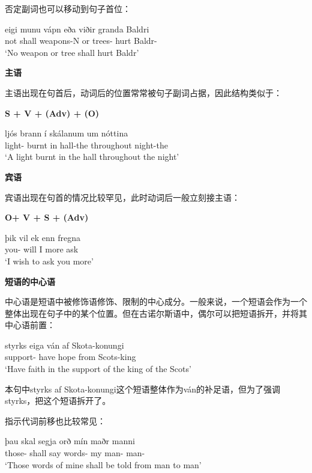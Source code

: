 否定副词也可以移动到句子首位：
\begin{exe}
    \ex \gll
    eigi	munu	vápn	eða	viðir	granda	Baldri\\
    not	shall	weapons-N	or	trees-{\nom}	hurt	Baldr-{\dat}\\
    \trans `No weapon or tree shall hurt Baldr’
\end{exe}

\textbf{主语}

主语出现在句首后，动词后的位置常常被句子副词占据，因此结构类似于：
\begin{center}
    \textbf{S + V + (Adv) + (O)}
\end{center}
\begin{exe}
    \ex \gll
    ljós	brann	í	skálanum	um	nóttina\\
    light-{\nom}	burnt	in	hall-the	throughout	night-the\\
    \trans `A light burnt in the hall throughout the night’
\end{exe}

\textbf{宾语}

宾语出现在句首的情况比较罕见，此时动词后一般立刻接主语：
\begin{center}
    \textbf{O+ V + S + (Adv)}
\end{center}
\begin{exe}
    \ex \gll
    þik	vil	ek	enn	fregna\\
    you-{\acc}	will	I	more	ask\\
    \trans `I wish to ask you more’
\end{exe}

\textbf{短语的中心语}

中心语是短语中被修饰语修饰、限制的中心成分。一般来说，一个短语会作为一个整体出现在句子中的某个位置。但在古诺尔斯语中，偶尔可以把短语拆开，并将其中心语前置：
\begin{exe}
    \ex \gll
    styrks	eiga	ván	af	Skota-konungi\\
    support-{\gen}	have	hope	from	Scots-king\\
    \trans `Have faith in the support of the king of the Scots’
\end{exe}

本句中styrks af Skota-konungi这个短语整体作为ván的补足语，但为了强调styrks，把这个短语拆开了。

指示代词前移也比较常见：
\begin{exe}
    \ex \gll
    þau	skal	segja	orð	mín	maðr	manni\\
    those-{\acc}	shall	say	words-{\acc}	my	man-{\nom}	man-{\dat}\\
    \trans `Those words of mine shall be told from man to man’
\end{exe}

